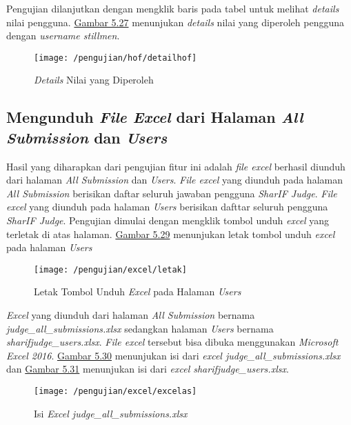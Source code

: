 	Pengujian dilanjutkan dengan mengklik baris pada tabel untuk melihat \textit{details} nilai pengguna. \hyperref[fig:dethof]{Gambar 5.27} menunjukan \textit{details} nilai yang diperoleh pengguna dengan \textit{username stillmen}.
	\begin{figure}[H]
		\centering  
		\texttt{[image: /pengujian/hof/detailhof]}  
		\caption[\textit{Details} Nilai yang Diperoleh]{\textit{Details} Nilai yang Diperoleh} 
		\label{fig:dethof} 
	\end{figure}

	\subsection{Mengunduh \textit{File Excel} dari Halaman \textit{All Submission} dan \textit{Users}}
	Hasil yang diharapkan dari pengujian fitur ini adalah \textit{file excel} berhasil diunduh dari halaman \textit{All Submission} dan \textit{Users}. \textit{File excel} yang diunduh pada halaman \textit{All Submission} berisikan daftar seluruh jawaban pengguna \textit{SharIF Judge}. \textit{File excel} yang diunduh pada halaman \textit{Users} berisikan dafttar seluruh pengguna \textit{SharIF Judge}. Pengujian dimulai dengan mengklik tombol unduh \textit{excel} yang terletak di atas halaman. \hyperref[fig:unduh]{Gambar 5.29} menunjukan letak tombol unduh \textit{excel} pada halaman \textit{Users}
	\begin{figure}[H]
		\centering  
		\texttt{[image: /pengujian/excel/letak]}  
		\caption[Letak Tombol Unduh \textit{Excel} pada Halaman \textit{Users}]{Letak Tombol Unduh \textit{Excel} pada Halaman \textit{Users}} 
		\label{fig:unduh} 
	\end{figure}

	\textit{Excel} yang diunduh dari halaman \textit{All Submission} bernama \textit{judge\_all\_submissions.xlsx} sedangkan halaman \textit{Users} bernama \textit{sharifjudge\_users.xlsx}. \textit{File excel} tersebut bisa dibuka menggunakan \textit{Microsoft Excel 2016}. \hyperref[fig:excelas]{Gambar 5.30} menunjukan isi dari \textit{excel judge\_all\_submissions.xlsx} dan \hyperref[fig:excelu]{Gambar 5.31} menunjukan isi dari \textit{excel sharifjudge\_users.xlsx}.
	\begin{figure}[H]
		\centering  
		\texttt{[image: /pengujian/excel/excelas]}  
		\caption[Isi \textit{Excel judge\_all\_submissions.xlsx}]{Isi \textit{Excel judge\_all\_submissions.xlsx}} 
		\label{fig:excelas} 
	\end{figure}

